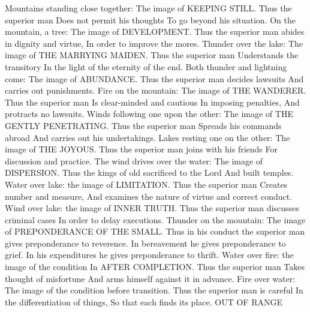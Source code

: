 {\or
Mountains standing close together:
The image of KEEPING STILL.
Thus the superior man
Does not permit his thoughts
To go beyond his situation.
\or
On the mountain, a tree:
The image of DEVELOPMENT.
Thus the superior man abides in dignity and virtue,
In order to improve the mores.
\or
Thunder over the lake:
The image of THE MARRYING MAIDEN.
Thus the superior man
Understands the transitory
In the light of the eternity of the end.
\or
Both thunder and lightning come:
The image of ABUNDANCE.
Thus the superior man decides lawsuits
And carries out punishments.
\or
Fire on the mountain:
The image of THE WANDERER.
Thus the superior man
Is clear-minded and cautious
In imposing penalties,
And protracts no lawsuits.
\or
Winds following one upon the other:
The image of THE GENTLY PENETRATING.
Thus the superior man
Spreads his commands abroad
And carries out his undertakings.
\or
Lakes resting one on the other:
The image of THE JOYOUS.
Thus the superior man joins with his friends
For discussion and practice.
\or
The wind drives over the water:
The image of DISPERSION.
Thus the kings of old sacrificed to the Lord
And built temples.
\or
Water over lake: the image of
LIMITATION.
Thus the superior man
Creates number and measure,
And examines the nature of virtue and correct conduct.
\or
Wind over lake: the image of INNER
TRUTH.
Thus the superior man discusses criminal cases
In order to delay executions.
\or
Thunder on the mountain:
The image of PREPONDERANCE OF THE
SMALL.
Thus in his conduct the superior man gives preponderance to reverence.
In bereavement he gives preponderance to grief.
In his expenditures he gives preponderance to thrift.
\or
Water over fire: the image of the condition
In AFTER COMPLETION.
Thus the superior man
Takes thought of misfortune
And arms himself against it in advance.
\or
Fire over water:
The image of the condition before transition.
Thus the superior man is careful
In the differentiation of things,
So that each finds its place.
\else OUT OF RANGE\fi
}

